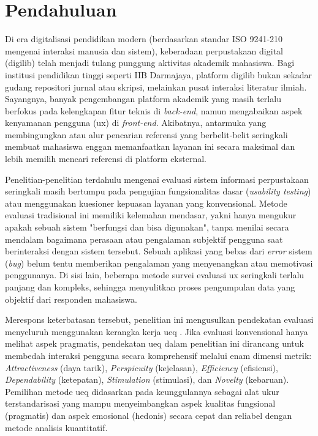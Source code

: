 \chapter{Pendahuluan}\label{cha:intro}

Di era digitalisasi pendidikan modern (berdasarkan standar ISO 9241-210 \cite{iso2019ergonomics} mengenai interaksi manusia dan sistem), keberadaan perpustakaan digital (\gls{digilib}) telah menjadi tulang punggung aktivitas akademik mahasiswa. Bagi institusi pendidikan tinggi seperti IIB Darmajaya, platform \gls{digilib} bukan sekadar gudang repositori jurnal atau skripsi, melainkan pusat interaksi literatur ilmiah. Sayangnya, banyak pengembangan platform akademik yang masih terlalu berfokus pada kelengkapan fitur teknis di \textit{back-end}, namun mengabaikan aspek kenyamanan pengguna (\gls{ux}) di \textit{front-end}. Akibatnya, antarmuka yang membingungkan atau alur pencarian referensi yang berbelit-belit seringkali membuat mahasiswa enggan memanfaatkan layanan ini secara maksimal dan lebih memilih mencari referensi di platform eksternal.

Penelitian-penelitian terdahulu mengenai evaluasi sistem informasi perpustakaan seringkali masih bertumpu pada pengujian fungsionalitas dasar (\textit{usability testing}) atau menggunakan kuesioner kepuasan layanan yang konvensional. Metode evaluasi tradisional ini memiliki kelemahan mendasar, yakni hanya mengukur apakah sebuah sistem "berfungsi dan bisa digunakan", tanpa menilai secara mendalam bagaimana perasaan atau pengalaman subjektif pengguna saat berinteraksi dengan sistem tersebut. Sebuah aplikasi yang bebas dari \textit{error} sistem (\textit{bug}) belum tentu memberikan pengalaman yang menyenangkan atau memotivasi penggunanya. Di sisi lain, beberapa metode survei evaluasi \gls{ux} seringkali terlalu panjang dan kompleks, sehingga menyulitkan proses pengumpulan data yang objektif dari responden mahasiswa.

Merespons keterbatasan tersebut, penelitian ini mengusulkan pendekatan evaluasi menyeluruh menggunakan kerangka kerja \gls{ueq} \cite{schrepp2014applying}. Jika evaluasi konvensional hanya melihat aspek pragmatis, pendekatan \gls{ueq} dalam penelitian ini dirancang untuk membedah interaksi pengguna secara komprehensif melalui enam dimensi metrik: \textit{Attractiveness} (daya tarik), \textit{Perspicuity} (kejelasan), \textit{Efficiency} (efisiensi), \textit{Dependability} (ketepatan), \textit{Stimulation} (stimulasi), dan \textit{Novelty} (kebaruan). Pemilihan metode \gls{ueq} didasarkan pada keunggulannya sebagai alat ukur terstandarisasi yang mampu menyeimbangkan aspek kualitas fungsional (pragmatis) dan aspek emosional (hedonis) secara cepat dan reliabel dengan metode analisis kuantitatif.

